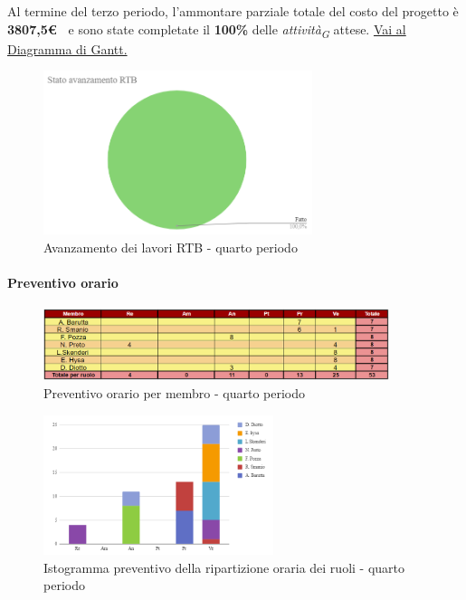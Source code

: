 Al termine del terzo periodo, l'ammontare parziale totale del costo del progetto è \textbf{ 3807,5\euro\ } e sono state completate il \textbf{100\%} delle \textit{attività}\textsubscript{\textit{G}} attese.
\href{https://github.com/orgs/ByteOps-swe/projects/3/views/1?sortedBy%5Bdirection%5D=asc&sortedBy%5BcolumnId%5D=64182560}{Vai al Diagramma di Gantt.}\hspace{1pt}


\begin{figure}[H]
    \centering
    \begin{minipage}[b]{0.70\textwidth}
        \centering
        \includegraphics[width=0.7\textwidth]{../Images/avanzamento4Periodo.png}
        \caption{Avanzamento dei lavori RTB - quarto periodo}
        \label{fig:Avanzamento_RTB_4}
    \end{minipage}
\end{figure}

\paragraph{Preventivo orario} \hspace{1pt}

\begin{figure}[H]
    \centering
    \includegraphics[width=0.9\textwidth]{../Images/preventivoOrario4Periodo.png}
    \caption{Preventivo orario per membro - quarto periodo}
    \label{fig:Preventivo_orario_4}
\end{figure}

\begin{figure}[H]
    \centering
    \includegraphics[width=0.6\textwidth]{../Images/preventivoDivisioneRuoli4Periodo.png}
    \caption{Istogramma preventivo della ripartizione oraria dei ruoli - quarto periodo}
    \label{fig:Preventivo_ripartizione_oraria_4}
\end{figure}

